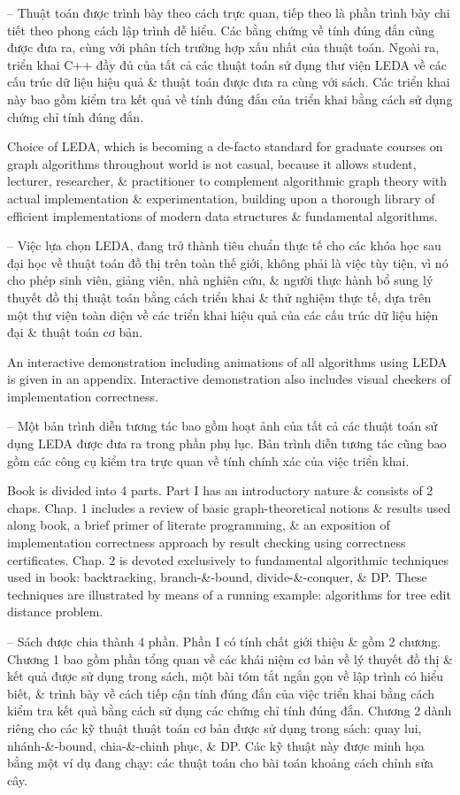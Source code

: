 \documentclass{article}
\begin{document}
\begin{itemize}
	-- Thuật toán được trình bày theo cách trực quan, tiếp theo là phần trình bày chi tiết theo phong cách lập trình dễ hiểu. Các bằng chứng về tính đúng đắn cũng được đưa ra, cùng với phân tích trường hợp xấu nhất của thuật toán. Ngoài ra, triển khai C++ đầy đủ của tất cả các thuật toán sử dụng thư viện LEDA về các cấu trúc dữ liệu hiệu quả \& thuật toán được đưa ra cùng với sách. Các triển khai này bao gồm kiểm tra kết quả về tính đúng đắn của triển khai bằng cách sử dụng chứng chỉ tính đúng đắn.
	
	Choice of LEDA, which is becoming a de-facto standard for graduate courses on graph algorithms throughout world is not casual, because it allows student, lecturer, researcher, \& practitioner to complement algorithmic graph theory with actual implementation \& experimentation, building upon a thorough library of efficient implementations of modern data structures \& fundamental algorithms.
	
	-- Việc lựa chọn LEDA, đang trở thành tiêu chuẩn thực tế cho các khóa học sau đại học về thuật toán đồ thị trên toàn thế giới, không phải là việc tùy tiện, vì nó cho phép sinh viên, giảng viên, nhà nghiên cứu, \& người thực hành bổ sung lý thuyết đồ thị thuật toán bằng cách triển khai \& thử nghiệm thực tế, dựa trên một thư viện toàn diện về các triển khai hiệu quả của các cấu trúc dữ liệu hiện đại \& thuật toán cơ bản.
	
	An interactive demonstration including animations of all algorithms using LEDA is given in an appendix. Interactive demonstration also includes visual checkers of implementation correctness.
	
	-- Một bản trình diễn tương tác bao gồm hoạt ảnh của tất cả các thuật toán sử dụng LEDA được đưa ra trong phần phụ lục. Bản trình diễn tương tác cũng bao gồm các công cụ kiểm tra trực quan về tính chính xác của việc triển khai.
	
	Book is divided into 4 parts. Part I has an introductory nature \& consists of 2 chaps. Chap. 1 includes a review of basic graph-theoretical notions \& results used along book, a brief primer of literate programming, \& an exposition of implementation correctness approach by result checking using correctness certificates. Chap. 2 is devoted exclusively to fundamental algorithmic techniques used in book: backtracking, branch-\&-bound, divide-\&-conquer, \& DP. These techniques are illustrated by means of a running example: algorithms for tree edit distance problem.
	
	-- Sách được chia thành 4 phần. Phần I có tính chất giới thiệu \& gồm 2 chương. Chương 1 bao gồm phần tổng quan về các khái niệm cơ bản về lý thuyết đồ thị \& kết quả được sử dụng trong sách, một bài tóm tắt ngắn gọn về lập trình có hiểu biết, \& trình bày về cách tiếp cận tính đúng đắn của việc triển khai bằng cách kiểm tra kết quả bằng cách sử dụng các chứng chỉ tính đúng đắn. Chương 2 dành riêng cho các kỹ thuật thuật toán cơ bản được sử dụng trong sách: quay lui, nhánh-\&-bound, chia-\&-chinh phục, \& DP. Các kỹ thuật này được minh họa bằng một ví dụ đang chạy: các thuật toán cho bài toán khoảng cách chỉnh sửa cây.
	

\end{itemize}
\end{document}
